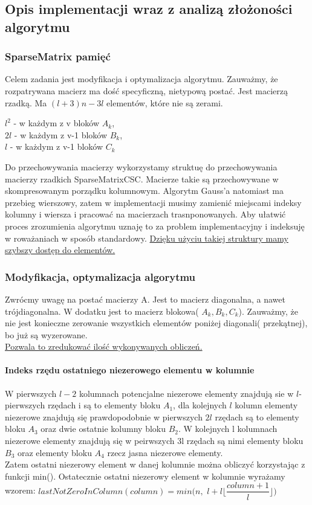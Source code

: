 \documentclass[11pt]{article}
\begin{document}
\begin{flushleft}
\subsection{Opis implementacji wraz z analizą złożoności algorytmu}
\subsubsection{SparseMatrix pamięć}
Celem zadania jest modyfikacja i optymalizacja algorytmu. Zauważmy, że rozpatrywana macierz ma dość specyficzną, nietypową postać. Jest macierzą rzadką. Ma $(l+3)n-3l$ elementów, które nie są zerami.\\
\begin{center}
$l^2$ - w każdym z v bloków $A_k$, \\ $2l$ - w każdym z v-1 bloków $B_k$, \\ $l$ - w każdym z v-1 bloków $C_k$\end{center} Do przechowywania macierzy wykorzystamy struktuę do przechowywania macierzy rzadkich SparseMatrixCSC. Macierze takie są przechowywane w skompresowanym porządku kolumnowym. Algorytm Gauss'a natomiast ma przebieg wierszowy, zatem w implementacji musimy zamienić miejscami indeksy kolumny i wiersza i pracować na macierzach trasnponowanych. Aby ułatwić proces zrozumienia algorytmu uznaję to za problem implementacyjny i indeksuję w roważaniach w sposób standardowy. \underline{Dzięku użyciu takiej struktury mamy szybszy dostęp do elementów.}
\subsubsection{Modyfikacja, optymalizacja algorytmu}
Zwrócmy uwagę na postać macierzy A. Jest to macierz diagonalna, a nawet trójdiagonalna. W dodatku jest to macierz blokowa( $A_k,B_k,C_k$). Zauważmy, że nie jest konieczne zerowanie wszystkich elementów poniżej diagonali( przekątnej), bo już są wyzerowane. \\ \underline{Pozwala to zredukować ilość wykonywanych obliczeń.}\\ 
\paragraph{Indeks rzędu ostatniego niezerowego elementu w kolumnie} W pierwszych $l-2$ kolumnach potencjalne niezerowe elementy znajdują sie w $l$-pierwszych rzędach i są to elementy bloku $A_1$, dla kolejnych $l$ kolumn elementy niezerowe znajdują się prawdopodobnie w pierwszych $2l$ rzędach są to elementy bloku $A_3$ oraz dwie ostatnie kolumny bloku $B_2$. W kolejnych l kolumnach niezerowe elementy znajdują się w peirwszych 3l rzędach są nimi elementy bloku $B_3$ oraz elementy bloku $A_4$ rzecz jasna niezerowe elementy.\\
Zatem ostatni niezerowy element w danej kolumnie można obliczyć korzystając z funkcji min(). Ostatecznie ostatni niezerowy element w kolumnie wyrażamy wzorem: $ lastNotZeroInColumn(column) = min \Big( n,$ $l+l \Big \lfloor \dfrac{column+1}{l} \Big \rfloor \Big)$

\end{flushleft}
\end{document}
